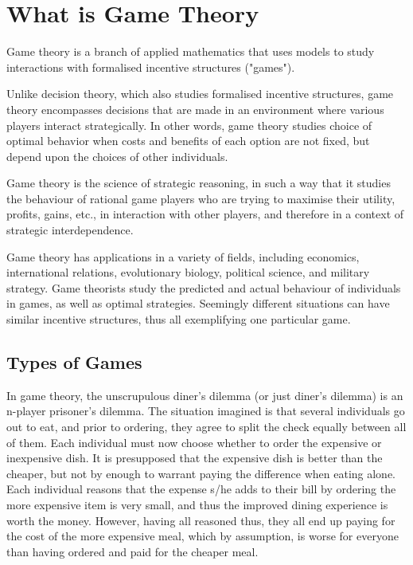 \documentclass[]{report}
\begin{document}
\section{What is Game Theory}

Game theory is a branch of applied mathematics that uses models to study interactions with formalised incentive structures ("games"). 

Unlike decision theory, which also studies formalised incentive structures, game theory encompasses decisions that are made in an environment where various players interact strategically. In other words, game theory studies choice of optimal behavior when costs and benefits of each option are not fixed, but depend upon the choices of other individuals.



Game theory is the science of strategic reasoning, in such a way that it studies the behaviour of rational game players who are trying to maximise their utility, profits, gains, etc., in interaction with other players, and therefore in a context of strategic interdependence.

Game theory has applications in a variety of fields, including economics,  international relations, evolutionary biology, political science, and  military strategy. Game theorists study the predicted and actual  behaviour of individuals in games, as well as optimal strategies.  Seemingly different situations can have similar incentive  structures, thus all exemplifying one particular game. 


\subsection{Types of Games}

In game theory, the unscrupulous diner's dilemma (or just diner's dilemma) is an n-player prisoner's dilemma. The situation imagined is that several individuals go out to eat, and prior to ordering, they agree to split the check equally between all of them. Each individual must now choose whether to order the expensive or inexpensive dish. It is presupposed that the expensive dish is better than the cheaper, but not by enough to warrant paying the difference when eating alone. Each individual reasons that the expense s/he adds to their bill by ordering the more expensive item is very small, and thus the improved dining experience is worth the money. However, having all reasoned thus, they all end up paying for the cost of the more expensive meal, which by assumption, is worse for everyone than having ordered and paid for the cheaper meal.
\end{document}
